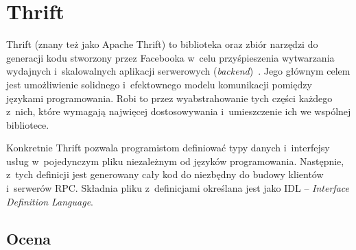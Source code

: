 \section{Thrift}
Thrift (znany też jako Apache Thrift) to biblioteka oraz zbiór narzędzi do generacji kodu stworzony przez Facebooka w~celu przyśpieszenia wytwarzania wydajnych i~skalowalnych aplikacji serwerowych (\emph{backend})~\cite{thrift-general}.
Jego głównym celem jest umożliwienie solidnego i~efektownego modelu komunikacji pomiędzy językami programowania.
Robi to przez wyabstrahowanie tych części każdego z~nich, które wymagają najwięcej dostosowywania i~umieszczenie ich we wspólnej bibliotece.

Konkretnie Thrift pozwala programistom definiować typy danych i~interfejsy usług w~pojedynczym pliku niezależnym od języków programowania.
Następnie, z~tych definicji jest generowany cały kod do niezbędny do budowy klientów i~serwerów RPC.
Składnia pliku z~definicjami określana jest jako IDL -- \emph{Interface Definition Language}.

\subsection{Ocena}

